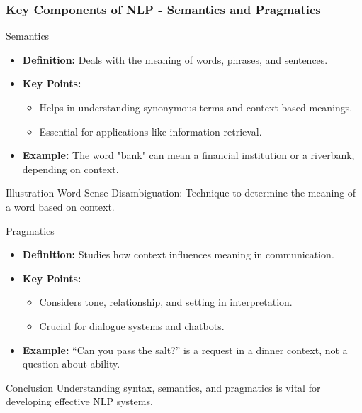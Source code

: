 \documentclass{beamer}
\begin{document}
\begin{frame}[fragile]
    \frametitle{Key Components of NLP - Semantics and Pragmatics}
    \begin{block}{Semantics}
        \begin{itemize}
            \item \textbf{Definition:} Deals with the meaning of words, phrases, and sentences.
            \item \textbf{Key Points:}
                \begin{itemize}
                    \item Helps in understanding synonymous terms and context-based meanings.
                    \item Essential for applications like information retrieval.
                \end{itemize}
            \item \textbf{Example:} The word "bank" can mean a financial institution or a riverbank, depending on context.
        \end{itemize}
        \begin{block}{Illustration}
            Word Sense Disambiguation: Technique to determine the meaning of a word based on context.
        \end{block}
    \end{block}
    
    \begin{block}{Pragmatics}
        \begin{itemize}
            \item \textbf{Definition:} Studies how context influences meaning in communication.
            \item \textbf{Key Points:}
                \begin{itemize}
                    \item Considers tone, relationship, and setting in interpretation.
                    \item Crucial for dialogue systems and chatbots.
                \end{itemize}
            \item \textbf{Example:} “Can you pass the salt?” is a request in a dinner context, not a question about ability.
        \end{itemize}
    \end{block}
   
    \begin{block}{Conclusion}
        Understanding syntax, semantics, and pragmatics is vital for developing effective NLP systems.
    \end{block}
\end{frame}
\end{document}
